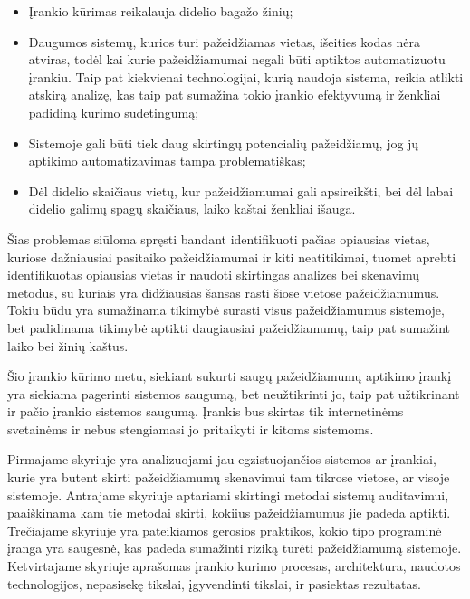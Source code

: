 \begin{itemize}
	\item Įrankio kūrimas reikalauja didelio bagažo žinių;
	\item Daugumos sistemų, kurios turi pažeidžiamas vietas, išeities kodas nėra atviras, todėl kai kurie pažeidžiamumai negali būti aptiktos automatizuotu įrankiu. Taip pat kiekvienai technologijai, kurią naudoja sistema, reikia atlikti atskirą analizę, kas taip pat sumažina tokio įrankio efektyvumą ir ženkliai padidiną kurimo sudetingumą;
	\item Sistemoje gali būti tiek daug skirtingų potencialių pažeidžiamų, jog jų aptikimo automatizavimas tampa problematiškas;
	\item Dėl didelio skaičiaus vietų, kur pažeidžiamumai gali apsireikšti, bei dėl labai didelio galimų spagų skaičiaus, laiko kaštai ženkliai išauga.
\end{itemize}

Šias problemas siūloma spręsti bandant identifikuoti pačias opiausias vietas, kuriose dažniausiai pasitaiko pažeidžiamumai ir kiti neatitikimai, tuomet  aprebti identifikuotas opiausias vietas ir naudoti skirtingas analizes bei skenavimų metodus, su kuriais yra didžiausias šansas rasti šiose vietose pažeidžiamumus. Tokiu būdu yra sumažinama tikimybė surasti visus pažeidžiamumus sistemoje, bet padidinama tikimybė aptikti daugiausiai pažeidžiamumų, taip pat sumažint laiko bei žinių kaštus. 

Šio įrankio kūrimo metu, siekiant sukurti saugų pažeidžiamumų aptikimo įrankį yra siekiama pagerinti sistemos saugumą, bet neužtikrinti jo, taip pat užtikrinant ir pačio įrankio sistemos saugumą. Įrankis bus skirtas tik internetinėms svetainėms ir
nebus stengiamasi jo pritaikyti ir kitoms sistemoms.

Pirmajame skyriuje yra analizuojami jau egzistuojančios sistemos ar įrankiai, kurie yra butent skirti pažeidžiamumų skenavimui tam tikrose vietose, ar visoje sistemoje.
Antrajame skyriuje aptariami skirtingi metodai sistemų auditavimui, paaiškinama kam tie metodai skirti, kokiius pažeidžiamumus jie padeda aptikti.
Trečiajame skyriuje yra pateikiamos gerosios praktikos, kokio tipo programinė įranga yra saugesnė, kas padeda sumažinti riziką turėti pažeidžiamumą sistemoje.
Ketvirtajame skyriuje aprašomas įrankio kurimo procesas, architektura, naudotos technologijos, nepasisekę tikslai, įgyvendinti tikslai, ir pasiektas rezultatas.